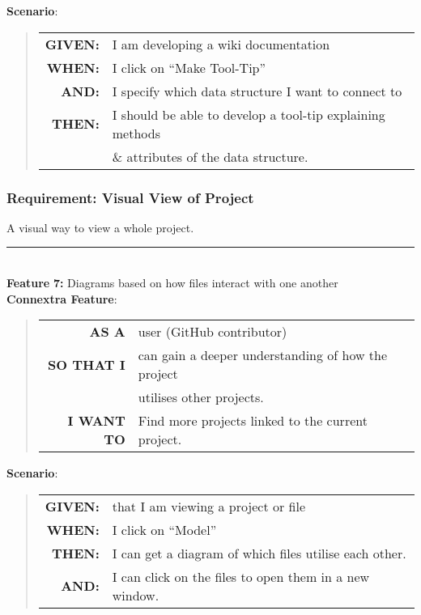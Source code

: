 \documentclass[12pt]{article}
\newcommand{\Feature}[1]{ 
   \noindent \textbf{Feature} #1
}
\newcommand{\GivenSc} {
	\noindent \textbf{GIVEN:}
	}
\newcommand{\WhenSc} {
	\noindent \textbf{WHEN:}
	}
\newcommand{\AndSc} {
	\noindent \textbf{AND:}
	}
\newcommand{\ThenSc} {
	\noindent \textbf{THEN:}
	}
\begin{document}
\begin{framed}
\noindent \textbf{Scenario}:
\begin{quote}
\begin{tabular}{rl}
\GivenSc & I am developing a wiki documentation\\
\WhenSc & I click on ``Make Tool-Tip''\\
\AndSc &  I specify which data structure I want to connect to\\
\ThenSc & I should be able to develop a tool-tip explaining methods\\
        &  \& attributes of the data structure.
\end{tabular}
\end{quote}
\end{framed}

\pagebreak
\begin{framed}
\subsubsection{Requirement: Visual View of Project}
A visual way to view a whole project.\\[0.2cm]

\hrule~\\

\noindent \Feature{\textbf{7:} Diagrams based on how files interact with one another}\\[0.2cm]

\noindent \textbf{Connextra Feature}:
\begin{quote}
\begin{tabular}{rl}
\textbf{AS A}      & user (\textsf{GitHub} contributor)\\
\textbf{SO THAT I} & can gain a deeper understanding of how the project\\
                   & utilises other projects.\\
\textbf{I WANT TO} & Find more projects linked to the current project.
\end{tabular}
\end{quote}

\noindent \textbf{Scenario}:
\begin{quote}
\begin{tabular}{rl}
\GivenSc & that I am viewing a project or file\\
\WhenSc & I click on “Model”\\
\ThenSc & I can get a diagram of which files utilise each other.\\
\AndSc & I can click on the files to open them in a new window.
\end{tabular}
\end{quote}


\end{framed}
\end{document}
